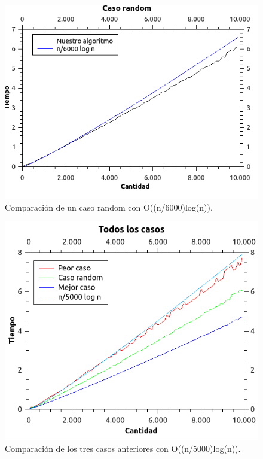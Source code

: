 \begin{figure}[H]
\begin{center}

  \includegraphics[width=\linewidth]{../graficos/ej2/Random.png}
  \caption{{\small Comparación de un caso random con O((n/6000)log(n)).}} \label{ej2-random-caso}
\endminipage

\end{center}
\end{figure}

\begin{figure}[H]
\begin{center}

  \includegraphics[width=\linewidth]{../graficos/ej2/Todos.png}
  \caption{{\small Comparación de los tres casos anteriores con O((n/5000)log(n)).}} \label{ej2-todos-casos}
\endminipage

\end{center}
\end{figure}
